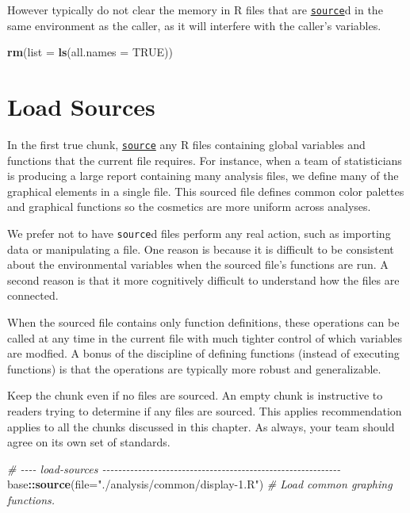 \documentclass[
]{book}
\newenvironment{Shaded}{\begin{snugshade}}{\end{snugshade}}
\newcommand{\CommentTok}[1]{\textcolor[rgb]{0.56,0.35,0.01}{\textit{#1}}}
\newcommand{\DataTypeTok}[1]{\textcolor[rgb]{0.13,0.29,0.53}{#1}}
\newcommand{\KeywordTok}[1]{\textcolor[rgb]{0.13,0.29,0.53}{\textbf{#1}}}
\newcommand{\NormalTok}[1]{#1}
\newcommand{\OperatorTok}[1]{\textcolor[rgb]{0.81,0.36,0.00}{\textbf{#1}}}
\newcommand{\OtherTok}[1]{\textcolor[rgb]{0.56,0.35,0.01}{#1}}
\newcommand{\StringTok}[1]{\textcolor[rgb]{0.31,0.60,0.02}{#1}}
\begin{document}
However typically do not clear the memory in R files that are \href{https://stat.ethz.ch/R-manual/R-devel/library/base/html/source.html}{\texttt{source}}d in the same environment as the caller, as it will interfere with the caller's variables.

\begin{Shaded}
\begin{Highlighting}[]
\KeywordTok{rm}\NormalTok{(}\DataTypeTok{list =} \KeywordTok{ls}\NormalTok{(}\DataTypeTok{all.names =} \OtherTok{TRUE}\NormalTok{))}
\end{Highlighting}
\end{Shaded}

\hypertarget{chunk-load-sources}{%
\section{Load Sources}\label{chunk-load-sources}}

In the first true chunk, \href{https://stat.ethz.ch/R-manual/R-devel/library/base/html/source.html}{\texttt{source}} any R files containing global variables and functions that the current file requires. For instance, when a team of statisticians is producing a large report containing many analysis files, we define many of the graphical elements in a single file. This sourced file defines common color palettes and graphical functions so the cosmetics are more uniform across analyses.

We prefer not to have \texttt{source}d files perform any real action, such as importing data or manipulating a file. One reason is because it is difficult to be consistent about the environmental variables when the sourced file's functions are run. A second reason is that it more cognitively difficult to understand how the files are connected.

When the sourced file contains only function definitions, these operations can be called at any time in the current file with much tighter control of which variables are modfied. A bonus of the discipline of defining functions (instead of executing functions) is that the operations are typically more robust and generalizable.

Keep the chunk even if no files are sourced. An empty chunk is instructive to readers trying to determine if any files are sourced. This applies recommendation applies to all the chunks discussed in this chapter. As always, your team should agree on its own set of standards.

\begin{Shaded}
\begin{Highlighting}[]
\CommentTok{\# {-}{-}{-}{-} load{-}sources {-}{-}{-}{-}{-}{-}{-}{-}{-}{-}{-}{-}{-}{-}{-}{-}{-}{-}{-}{-}{-}{-}{-}{-}{-}{-}{-}{-}{-}{-}{-}{-}{-}{-}{-}{-}{-}{-}{-}{-}{-}{-}{-}{-}{-}{-}{-}{-}{-}{-}{-}{-}{-}{-}{-}{-}{-}{-}{-}{-}}
\NormalTok{base}\OperatorTok{::}\KeywordTok{source}\NormalTok{(}\DataTypeTok{file=}\StringTok{"./analysis/common/display{-}1.R"}\NormalTok{)      }\CommentTok{\# Load common graphing functions.}
\end{Highlighting}
\end{Shaded}
\end{document}
